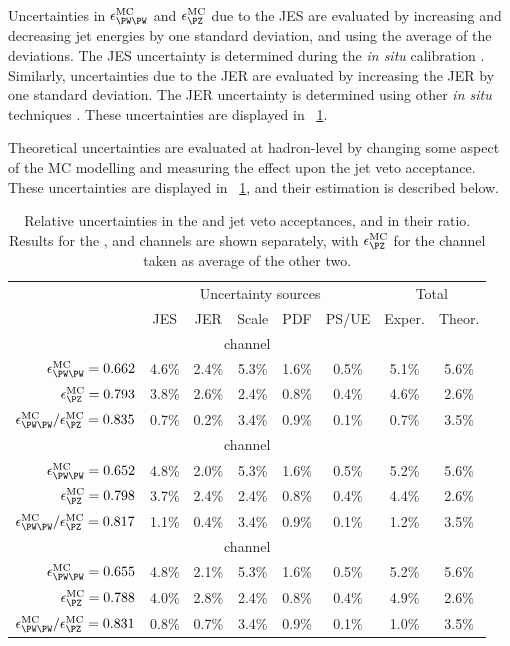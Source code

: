 Uncertainties in $\epsilon^{\text{MC}}_{\WW}$ and $\epsilon^{\text{MC}}_{\PZ}$ due to the 
JES are evaluated by increasing and decreasing jet energies by one standard deviation, 
and using the average of the deviations. The JES uncertainty is determined during the 
\textit{in situ} calibration \cite{Jets:Calib:2011}. Similarly, uncertainties due to the 
JER are evaluated by increasing the JER by one standard deviation. The JER uncertainty is 
determined using other \textit{in situ} techniques \cite{Jets:JER:2011}. These 
uncertainties are displayed in \Table~\ref{tab:ww:jetveto_unc}.

Theoretical uncertainties are evaluated at hadron-level by changing some aspect of the MC 
modelling and measuring the effect upon the jet veto acceptance. These uncertainties are 
displayed in \Table~\ref{tab:ww:jetveto_unc}, and their estimation is described below.

\begin{table}
	\begin{tabular}{r|ccccc|cc}
		\toprule
		& \multicolumn{5}{c|}{Uncertainty sources} & \multicolumn{2}{c}{Total} \\
		& JES & JER & Scale & PDF & PS/UE & Exper. & Theor. \\
		\midrule
		\multicolumn{8}{c}{\emch channel} \\
		\midrule
		$\epsilon^{\text{MC}}_{\WW} = 0.662$ 
		& 4.6\% & 2.4\% & 5.3\% & 1.6\% & 0.5\% & 5.1\% & 5.6\% \\
		$\epsilon^{\text{MC}}_{\PZ} = 0.793$ 
		& 3.8\% & 2.6\% & 2.4\% & 0.8\% & 0.4\% & 4.6\% & 2.6\% \\
		$\epsilon^{\text{MC}}_{\WW} / \epsilon^{\text{MC}}_{\PZ} = 0.835$ 
		& 0.7\% & 0.2\% & 3.4\% & 0.9\% & 0.1\% & 0.7\% & 3.5\% \\
		\midrule
		\multicolumn{8}{c}{\eech channel} \\
		\midrule
		$\epsilon^{\text{MC}}_{\WW} = 0.652$ 
		& 4.8\% & 2.0\% & 5.3\% & 1.6\% & 0.5\% & 5.2\% & 5.6\% \\
		$\epsilon^{\text{MC}}_{\PZ} = 0.798$ 
		& 3.7\% & 2.4\% & 2.4\% & 0.8\% & 0.4\% & 4.4\% & 2.6\% \\
		$\epsilon^{\text{MC}}_{\WW} / \epsilon^{\text{MC}}_{\PZ} = 0.817$ 
		& 1.1\% & 0.4\% & 3.4\% & 0.9\% & 0.1\% & 1.2\% & 3.5\% \\
		\midrule
		\multicolumn{8}{c}{\mmch channel} \\
		\midrule
		$\epsilon^{\text{MC}}_{\WW} = 0.655$ 
		& 4.8\% & 2.1\% & 5.3\% & 1.6\% & 0.5\% & 5.2\% & 5.6\% \\
		$\epsilon^{\text{MC}}_{\PZ} = 0.788$ 
		& 4.0\% & 2.8\% & 2.4\% & 0.8\% & 0.4\% & 4.9\% & 2.6\% \\
		$\epsilon^{\text{MC}}_{\WW} / \epsilon^{\text{MC}}_{\PZ} = 0.831$ 
		& 0.8\% & 0.7\% & 3.4\% & 0.9\% & 0.1\% & 1.0\% & 3.5\% \\
		\bottomrule
	\end{tabular}
	\caption{Relative uncertainties in the \WW and \PZ jet veto acceptances, and in their 
	ratio. Results for the \eech, \mmch and \emch channels are shown separately, with 
	$\epsilon^{\text{MC}}_{\PZ}$ for the \emch channel taken as average of the other two.}
	\label{tab:ww:jetveto_unc}
\end{table}

